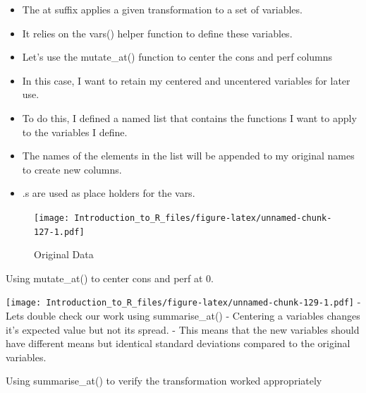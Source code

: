 \documentclass[]{book}
\newenvironment{Shaded}{\begin{snugshade}}{\end{snugshade}}
\newcommand{\DataTypeTok}[1]{\textcolor[rgb]{0.13,0.29,0.53}{#1}}
\newcommand{\KeywordTok}[1]{\textcolor[rgb]{0.13,0.29,0.53}{\textbf{#1}}}
\newcommand{\NormalTok}[1]{#1}
\newcommand{\OperatorTok}[1]{\textcolor[rgb]{0.81,0.36,0.00}{\textbf{#1}}}
\newcommand{\OtherTok}[1]{\textcolor[rgb]{0.56,0.35,0.01}{#1}}
\newcommand{\StringTok}[1]{\textcolor[rgb]{0.31,0.60,0.02}{#1}}
\providecommand{\tightlist}{%
  \setlength{\itemsep}{0pt}\setlength{\parskip}{0pt}}
\theoremstyle{definition}
\theoremstyle{definition}
\theoremstyle{definition}
\theoremstyle{remark}
\let\BeginKnitrBlock\begin \let\EndKnitrBlock\end
\begin{document}
\begin{itemize}
\tightlist
\item
  The at suffix applies a given transformation to a set of variables.
\item
  It relies on the vars() helper function to define these variables.
\item
  Let's use the mutate\_at() function to center the cons and perf columns
\item
  In this case, I want to retain my centered and uncentered variables for later use.
\item
  To do this, I defined a named list that contains the functions I want to apply to the variables I define.
\item
  The names of the elements in the list will be appended to my original names to create new columns.
\item
  .s are used as place holders for the vars.
\end{itemize}

\begin{figure}
\centering
\texttt{[image: Introduction\_to\_R\_files/figure-latex/unnamed-chunk-127-1.pdf]}
\caption{\label{fig:unnamed-chunk-127}Original Data}
\end{figure}

\BeginKnitrBlock{example}
\protect\hypertarget{exm:mutateat}{}{\label{exm:mutateat} }Using mutate\_at() to center cons and perf at 0.
\EndKnitrBlock{example}

\begin{Shaded}
\end{Shaded}

\texttt{[image: Introduction\_to\_R\_files/figure-latex/unnamed-chunk-129-1.pdf]}
- Lets double check our work using summarise\_at()
- Centering a variables changes it's expected value but not its spread.
- This means that the new variables should have different means but identical standard deviations compared to the original variables.

\BeginKnitrBlock{example}
\protect\hypertarget{exm:summariseat}{}{\label{exm:summariseat} }Using summarise\_at() to verify the transformation worked appropriately
\EndKnitrBlock{example}
\end{document}
